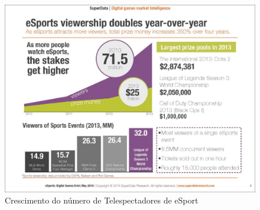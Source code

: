 \documentclass[a4paper, 12pt]{paper}
\begin{document}
\begin{figure}[!ht]
	\centering
	\includegraphics[scale=0.45]{img/img01.png}
	\caption{Crescimento do número de Telespectadores de eSport}	
\end{figure}
	
\end{document}

